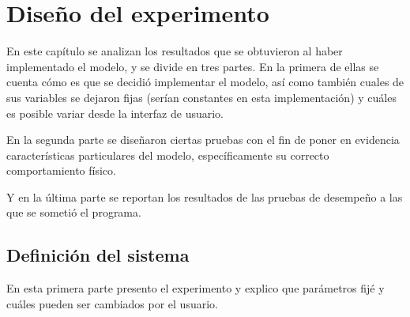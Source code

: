 \chapter{Diseño del experimento}
En este capítulo se analizan los resultados que se obtuvieron al haber implementado el modelo, y se divide en tres partes.
En la primera de ellas se cuenta cómo es que se decidió implementar el modelo, así como también cuales de sus variables se dejaron fijas (serían constantes en esta implementación) y cuáles es posible variar desde la interfaz de usuario.

En la segunda parte se diseñaron ciertas pruebas con el fin de poner en evidencia características particulares del modelo, específicamente su correcto comportamiento físico.

Y en la última parte se reportan los resultados de las pruebas de desempeño a las que se sometió el programa.

\section{Definición del sistema}
En esta primera parte presento el experimento y explico que parámetros fijé y cuáles pueden ser cambiados por el usuario.

